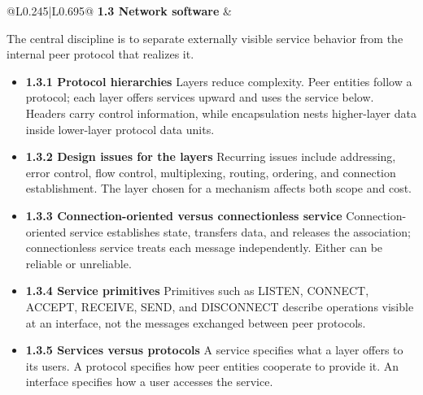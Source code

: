 \documentclass[10pt,letterpaper]{article}
\begin{document}
\begin{longtable}{@{}L{0.245\textwidth}|L{0.695\textwidth}@{}}
\textbf{1.3 Network software} & \begin{minipage}[t]{\linewidth}\raggedright The central discipline is to separate externally visible service behavior from the internal peer protocol that realizes it.\par\begin{itemize}\item \textbf{1.3.1 Protocol hierarchies} Layers reduce complexity. Peer entities follow a protocol; each layer offers services upward and uses the service below. Headers carry control information, while encapsulation nests higher-layer data inside lower-layer protocol data units.\item \textbf{1.3.2 Design issues for the layers} Recurring issues include addressing, error control, flow control, multiplexing, routing, ordering, and connection establishment. The layer chosen for a mechanism affects both scope and cost.\item \textbf{1.3.3 Connection-oriented versus connectionless service} Connection-oriented service establishes state, transfers data, and releases the association; connectionless service treats each message independently. Either can be reliable or unreliable.\item \textbf{1.3.4 Service primitives} Primitives such as LISTEN, CONNECT, ACCEPT, RECEIVE, SEND, and DISCONNECT describe operations visible at an interface, not the messages exchanged between peer protocols.\item \textbf{1.3.5 Services versus protocols} A service specifies what a layer offers to its users. A protocol specifies how peer entities cooperate to provide it. An interface specifies how a user accesses the service.\end{itemize}\end{minipage} \\ \hline

\end{longtable}
\end{document}
